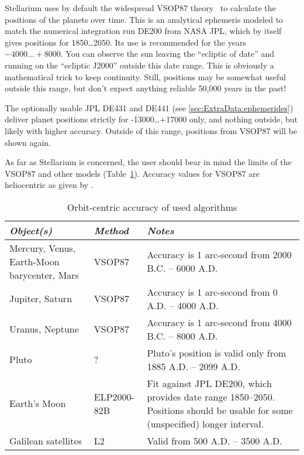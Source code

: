 Stellarium uses by default the widespread VSOP87 theory~\citep{1988A&A...202..309B} %
to calculate the positions of the planets over time.
This is an analytical ephemeris modeled to match the numerical
integration run DE200 from NASA JPL, which by itself gives positions for 1850\ldots2050. 
Its use is recommended for the years $-4000\ldots+8000$. You can observe the sun leaving the ``ecliptic
of date'' and running on the ``ecliptic J2000'' outside this date
range. This is obviously a mathematical trick to keep
continuity. Still, positions may be somewhat useful outside this
range, but don't expect anything reliable 50,000 years in the past! 

The optionally usable JPL DE431 and DE441 (see \ref{sec:ExtraData:ephemerides}) deliver planet positions strictly for
-13000\ldots+17000 only, and nothing outside, but likely with higher accuracy. 
Outside of this range, positions from VSOP87 will be shown again.

As far as Stellarium is concerned, the user should bear in mind the
limits of the VSOP87 and other models (Table~\ref{tab:Accuracy:Planets}).
Accuracy values for VSOP87 are heliocentric as given by \citet{1988A&A...202..309B}.

\begin{table}[tb]
\begin{tabularx}{\textwidth}{X|l|X}
\toprule
\emph{Object(s)} & \emph{Method} & \emph{Notes}\tabularnewline
\midrule
Mercury, Venus, Earth-Moon barycenter, Mars & VSOP87 & Accuracy is 1 arc-second from 2000 B.C. -- 6000 A.D. \\%
Jupiter, Saturn                             & VSOP87 & Accuracy is 1 arc-second from 0 A.D. -- 4000 A.D.    \\%
Uranus, Neptune                             & VSOP87 & Accuracy is 1 arc-second from 4000 B.C. -- 8000 A.D. \\%
Pluto                                       & ?      & Pluto's position is valid only from 1885 A.D. -- 2099 A.D.\\%
Earth's Moon                                & ELP2000-82B & Fit against JPL DE200, which provides date range 1850--2050. 
                                                            Positions should be usable for some (unspecified) longer interval. \\%
Galilean satellites                         & L2     & Valid from 500 A.D. -- 3500 A.D.\\ 
\bottomrule
\end{tabularx}
\caption{Orbit-centric accuracy of used algorithms}
\label{tab:Accuracy:Planets}
\end{table}

